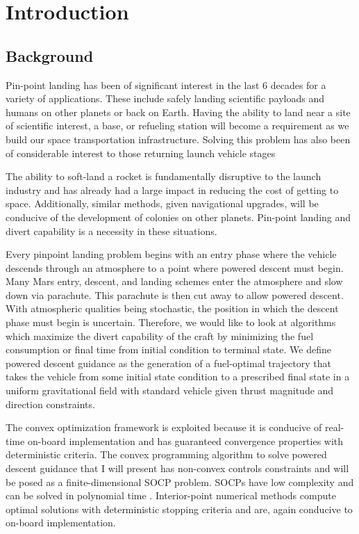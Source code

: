 \chapter{Introduction}
\label{introchap}

\section{Background}
Pin-point landing has been of significant interest in the last 6 decades for a variety of applications. These include safely landing scientific payloads and humans on other planets or back on Earth. Having the ability to land near a site of scientific interest, a base, or refueling station will become a requirement as we build our space transportation infrastructure. Solving this problem has also been of considerable interest to those returning launch vehicle stages 

The ability to soft-land a rocket is fundamentally disruptive to the launch industry and has already had a large impact in reducing the cost of getting to space. Additionally, similar methods, given navigational upgrades, will be conducive of the development of colonies on other planets. Pin-point landing and divert capability is a necessity in these situations.

Every pinpoint landing problem begins with an entry phase where the vehicle descends through an atmosphere to a point where powered descent must begin. Many Mars entry, descent, and landing schemes enter the atmosphere and slow down via parachute. This parachute is then cut away to allow powered descent. With atmospheric qualities being stochastic, the position in which the descent phase must begin is uncertain. Therefore, we would like to look at algorithms which maximize the divert capability of the craft by minimizing the fuel consumption or final time from initial condition to terminal state. We define powered descent guidance as the generation of a fuel-optimal trajectory that takes the vehicle from some initial state condition to a prescribed final state in a uniform gravitational field with standard vehicle given thrust magnitude and direction constraints.

The convex optimization framework is exploited because it is conducive of real-time on-board implementation and has guaranteed convergence properties with deterministic criteria. The convex programming algorithm to solve powered descent guidance that I will present has non-convex controls constraints and will be posed as a finite-dimensional SOCP problem. SOCPs have low complexity and can be solved in polynomial time \cite{boyd2004convex}. Interior-point numerical methods compute optimal solutions with deterministic stopping criteria and are, again conducive to on-board implementation. 

